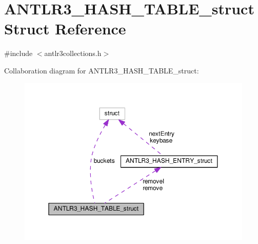 \hypertarget{struct_a_n_t_l_r3___h_a_s_h___t_a_b_l_e__struct}{\section{A\-N\-T\-L\-R3\-\_\-\-H\-A\-S\-H\-\_\-\-T\-A\-B\-L\-E\-\_\-struct Struct Reference}
\label{struct_a_n_t_l_r3___h_a_s_h___t_a_b_l_e__struct}
}


{\ttfamily \#include $<$antlr3collections.\-h$>$}



Collaboration diagram for A\-N\-T\-L\-R3\-\_\-\-H\-A\-S\-H\-\_\-\-T\-A\-B\-L\-E\-\_\-struct\-:
\nopagebreak
\begin{figure}[H]
\begin{center}
\leavevmode
\includegraphics[width=350pt]{struct_a_n_t_l_r3___h_a_s_h___t_a_b_l_e__struct__coll__graph}
\end{center}
\end{figure}
